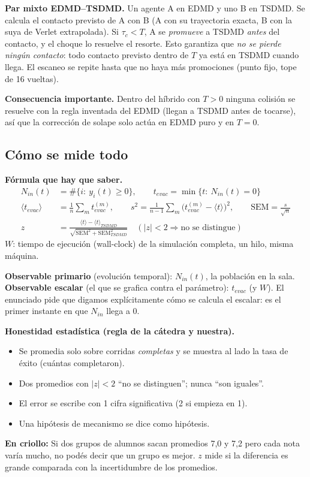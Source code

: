 \documentclass[10.5pt,a4paper]{article}
\newcommand{\analogia}[1]{\par\colorbox{ana}{\parbox{\dimexpr\linewidth-2\fboxsep}{\textbf{En criollo:} #1}}\par}
\newcommand{\formula}[1]{\par\colorbox{fml}{\parbox{\dimexpr\linewidth-2\fboxsep}{\textbf{Fórmula que hay que saber.} #1}}\par}
\begin{document}
\textbf{Par mixto EDMD--TSDMD.} Un agente A en EDMD y uno B en TSDMD. Se calcula el contacto previsto de A con B (A con su trayectoria exacta, B con la suya de Verlet extrapolada). Si $\tau_c<T$, A se \emph{promueve} a TSDMD \emph{antes} del contacto, y el choque lo resuelve el resorte. Esto garantiza que \emph{no se pierde ningún contacto}: todo contacto previsto dentro de $T$ ya está en TSDMD cuando llega. El escaneo se repite hasta que no haya más promociones (punto fijo, tope de 16 vueltas).

\textbf{Consecuencia importante.} Dentro del híbrido con $T>0$ ninguna colisión se resuelve con la regla inventada del EDMD (llegan a TSDMD antes de tocarse), así que la corrección de solape solo actúa en EDMD puro y en $T=0$.

\subsection{Cómo se mide todo}
\formula{
\begin{align*}
N_{in}(t)&=\#\{i:\ y_i(t)\geq0\},\qquad t_{evac}=\min\{t:\ N_{in}(t)=0\}\\
\langle t_{evac}\rangle&=\tfrac1n\textstyle\sum_m t^{(m)}_{evac},\qquad s^2=\tfrac1{n-1}\textstyle\sum_m\bigl(t^{(m)}_{evac}-\langle t\rangle\bigr)^2,\qquad \mathrm{SEM}=\tfrac{s}{\sqrt n}\\
z&=\frac{\langle t\rangle-\langle t\rangle_{TSDMD}}{\sqrt{\mathrm{SEM}^2+\mathrm{SEM}_{TSDMD}^2}}\quad(|z|<2\Rightarrow\text{no se distingue})
\end{align*}
$W$: tiempo de ejecución (wall-clock) de la simulación completa, un hilo, misma máquina.}
\textbf{Observable primario} (evolución temporal): $N_{in}(t)$, la población en la sala. \textbf{Observable escalar} (el que se grafica contra el parámetro): $t_{evac}$ (y $W$). El enunciado pide que digamos explícitamente cómo se calcula el escalar: es el primer instante en que $N_{in}$ llega a 0.

\textbf{Honestidad estadística (regla de la cátedra y nuestra).}
\begin{itemize}
\item Se promedia solo sobre corridas \emph{completas} y se muestra al lado la tasa de éxito (cuántas completaron).
\item Dos promedios con $|z|<2$ ``no se distinguen''; nunca ``son iguales''.
\item El error se escribe con 1 cifra significativa (2 si empieza en 1).
\item Una hipótesis de mecanismo se dice como hipótesis.
\end{itemize}
\analogia{Si dos grupos de alumnos sacan promedios 7,0 y 7,2 pero cada nota varía mucho, no podés decir que un grupo es mejor. $z$ mide si la diferencia es grande comparada con la incertidumbre de los promedios.}
\end{document}
